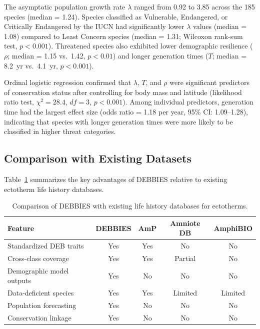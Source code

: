 \documentclass[11pt]{article}
\begin{document}
The asymptotic population growth rate $\lambda$ ranged from 0.92 to 3.85 across the 185 species (median = 1.24). Species classified as Vulnerable, Endangered, or Critically Endangered by the IUCN had significantly lower $\lambda$ values (median = 1.08) compared to Least Concern species (median = 1.31; Wilcoxon rank-sum test, $p < 0.001$). Threatened species also exhibited lower demographic resilience ($\rho$; median = 1.15 vs.\ 1.42, $p < 0.01$) and longer generation times ($T$; median = 8.2~yr vs.\ 4.1~yr, $p < 0.001$).

Ordinal logistic regression confirmed that $\lambda$, $T$, and $\rho$ were significant predictors of conservation status after controlling for body mass and latitude (likelihood ratio test, $\chi^2 = 28.4$, $df = 3$, $p < 0.001$). Among individual predictors, generation time had the largest effect size (odds ratio = 1.18 per year, 95\% CI: 1.09--1.28), indicating that species with longer generation times were more likely to be classified in higher threat categories.

\subsection{Comparison with Existing Datasets}

Table~\ref{tab:comparison} summarizes the key advantages of DEBBIES relative to existing ectotherm life history databases.

\begin{table}[t]
\centering
\caption{Comparison of DEBBIES with existing life history databases for ectotherms.}
\label{tab:comparison}
\begin{tabular}{@{}lcccc@{}}
\toprule
Feature & DEBBIES & AmP & Amniote DB & AmphiBIO \\
\midrule
Standardized DEB traits      & Yes & Yes & No  & No  \\
Cross-class coverage          & Yes & Yes & Partial & No  \\
Demographic model outputs     & Yes & No  & No  & No  \\
Data-deficient species        & Yes & Yes & Limited & Limited \\
Population forecasting        & Yes & No  & No  & No  \\
Conservation linkage          & Yes & No  & No  & No  \\
\bottomrule
\end{tabular}
\end{table}

\end{document}
